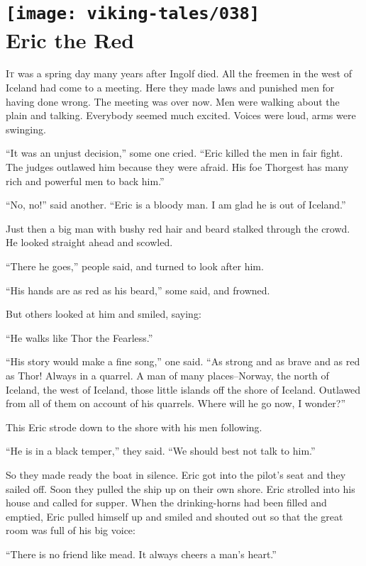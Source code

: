 \section[Eric the Red]{
    \texttt{[image: viking-tales/038]}\\
    Eric the Red}

\lettrine{I}{t} was a spring day many years after Ingolf died. All the
freemen in the west of Iceland had come to a meeting. Here they made laws
and punished men for having done wrong. The meeting was over now. Men
were walking about the plain and talking. Everybody seemed much excited.
Voices were loud, arms were swinging.

``It was an unjust decision,'' some one cried. ``Eric killed the men in
fair fight. The judges outlawed him because they were afraid. His foe
Thorgest has many rich and powerful men to back him.''

``No, no!'' said another. ``Eric is a bloody man. I am glad he is out of
Iceland.''

Just then a big man with bushy red hair and beard stalked through the
crowd. He looked straight ahead and scowled.

``There he goes,'' people said, and turned to look after him.

``His hands are as red as his beard,'' some said, and frowned.

But others looked at him and smiled, saying:

``He walks like Thor the Fearless.''

``His story would make a fine song,'' one said. ``As strong and as brave
and as red as Thor! Always in a quarrel. A man of many places--Norway,
the north of Iceland, the west of Iceland, those little islands off the
shore of Iceland. Outlawed from all of them on account of his quarrels.
Where will he go now, I wonder?''

This Eric strode down to the shore with his men following.

``He is in a black temper,'' they said. ``We should best not talk to
him.''

So they made ready the boat in silence. Eric got into the pilot's seat
and they sailed off. Soon they pulled the ship up on their own shore.
Eric strolled into his house and called for supper. When the
drinking-horns had been filled and emptied, Eric pulled himself up and
smiled and shouted out so that the great room was full of his big voice:

``There is no friend like mead. It always cheers a man's heart.''

